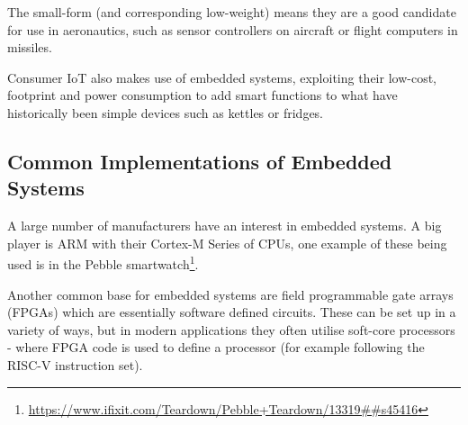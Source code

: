 The small-form (and corresponding low-weight) means they are a good candidate for use in aeronautics, such as sensor controllers on aircraft or flight computers in missiles.

Consumer IoT also makes use of embedded systems, exploiting their low-cost, footprint and power consumption to add smart functions to what have historically been simple devices such as kettles or fridges.

\subsection{Common Implementations of Embedded Systems}\label{implementationsEmbeddedSystems}
A large number of manufacturers have an interest in embedded systems. A big player is ARM with their Cortex-M Series of CPUs, one example of these being used is in the Pebble smartwatch\footnote{\url{https://www.ifixit.com/Teardown/Pebble+Teardown/13319##s45416}}.

Another common base for embedded systems are field programmable gate arrays (FPGAs) which are essentially software defined circuits. These can be set up in a variety of ways, but in modern applications they often utilise soft-core processors - where FPGA code is used to define a processor (for example following the RISC-V instruction set).
